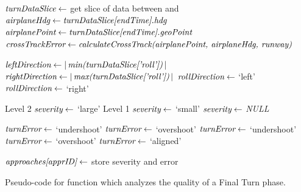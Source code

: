             
            \begin{algorithm}
                \begin{algorithmic}[1]\raggedright
                    \State $ \textit{turnDataSlice} \gets $ get slice of data between  and 
                    \State $ \textit{airplaneHdg} \gets \textit{turnDataSlice[endTime].hdg} $
                    \State $ \textit{airplanePoint} \gets \textit{turnDataSlice[endTime].geoPoint} $
                    \State $ \var{crossTrackError} \gets \var{calculateCrossTrack(} \break \var{airplanePoint, airplaneHdg, runway)} $
                    
                    \State $ \textit{leftDirection} \gets \left|\,\textit{min(turnDataSlice['roll'])}\,\right| $
                    \State $ \textit{rightDirection} \gets \left|\,\textit{max(turnDataSlice['roll'])}\,\right| $
                    	\State $ \textit{rollDirection} \gets $ `left'
                    \Else
                    	\State $ \textit{rollDirection} \gets $ `right'
                    \EndIf
                    
                       \Comment Level 2
                    	\State $ \textit{severity} \gets $ `large'
                     \Comment Level 1
                    	\State $ \textit{severity} \gets $ `small'
                    \Else
                    	\State $ \textit{severity} \gets $ \textit{NULL}
                    \EndIf
                    
                            	\State $ \textit{turnError} \gets $ `undershoot'
                            \Else
                            	\State $ \textit{turnError} \gets $ `overshoot'
                            \EndIf
                        \Else
                            	\State $ \textit{turnError} \gets $ `undershoot'
                            \Else
                            	\State $ \textit{turnError} \gets $ `overshoot'
                            \EndIf
                        \EndIf
                    \Else
                    	\State $ \textit{turnError} \gets $ `aligned'
                    \EndIf
                    
                    \State $ \textit{approaches[apprID]} \gets $ store severity and error
                    
                    \State \Return {}
                \EndFunction
                \end{algorithmic}
                \caption{Pseudo-code for function which analyzes the quality of a Final Turn phase.}
                \label{alg:analyze_final_turn}
            \end{algorithm}
        
